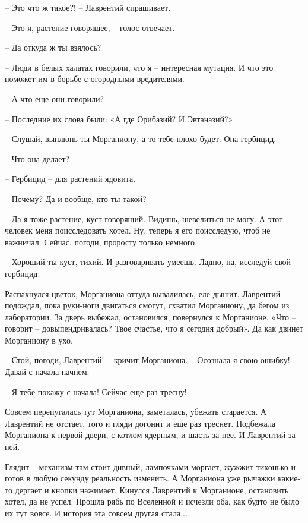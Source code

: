 \documentclass[ebook,oneside,final,openright]{memoir}
\begin{document}
\par
– Это что ж такое?! – Лаврентий спрашивает.\par
– Это я, растение говорящее, – голос отвечает.\par
– Да откуда ж ты взялось?\par
– Люди в белых халатах говорили, что я – интересная мутация. И что это поможет им в борьбе с огородными вредителями.\par
– А что еще они говорили?\par
– Последние их слова были: «А где Орибазий? И Эвтаназий?»\par
– Слушай, выплюнь ты Морганиону, а то тебе плохо будет. Она гербицид.\par
– Что она делает?\par
– Гербицид – для растений ядовита.\par
– Почему? Да и вообще, кто ты такой?\par
– Да я тоже растение, куст говорящий. Видишь, шевелиться не могу. А этот человек меня поисследовать хотел. Ну, теперь я его поисследую, чтоб не важничал. Сейчас, погоди, проросту только немного.\par
– Хороший ты куст, тихий. И разговаривать умеешь. Ладно, на, исследуй свой гербицид.\par
\par
Распахнулся цветок, Морганиона оттуда вывалилась, еле дышит. Лаврентий подождал, пока руки-ноги двигаться смогут, схватил Морганиону, да бегом из лаборатории. За дверь выбежал, остановился, повернулся к Морганионе. «Что – говорит – довыпендривалась? Твое счастье, что я сегодня добрый». Да как двинет Морганиону в ухо.\par
\par
– Стой, погоди, Лаврентий! – кричит Морганиона. – Осознала я свою ошибку! Давай с начала начнем.\par
– Я тебе покажу с начала! Сейчас еще раз тресну!\par
\par
Совсем перепугалась тут Морганиона, заметалась, убежать старается. А Лаврентий не отстает, того и гляди догонит и еще раз треснет. Подбежала Морганиона к первой двери, с котлом ядерным, и шасть за нее. И Лаврентий за ней.\par
\par
Глядит – механизм там стоит дивный, лампочками моргает, жужжит тихонько и готов в любую секунду реальность изменить. А Морганиона уже рычажки какие-то дергает и кнопки нажимает. Кинулся Лаврентий к Морганионе, остановить хотел, да не успел. Прошла рябь по Вселенной и исчезли оба, как будто не было их тут вовсе. И история эта совсем другая стала...\par
\end{document}
